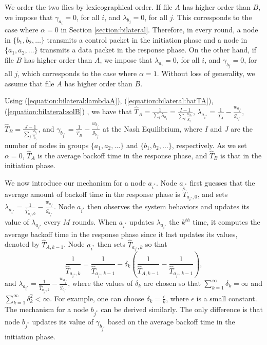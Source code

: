 \documentclass[11pt, conference]{IEEEtran}
\begin{document}
We order the two flies by lexicographical order. If file $A$ has higher order than $B$, we impose that $\gamma_{a_i}=0$, for all $i$, and $\lambda_{b_j}=0$, for all $j$. This corresponds to the case where $\alpha=0$ in Section \ref{section:bilateral}. Therefore, in every round, a node in $\{b_1,b_2,\dots\}$ transmits a control packet in the initiation phase and a node in $\{a_1,a_2,\dots\}$ transmits a data packet in the response phase. On the other hand, if file $B$ has higher order than $A$, we impose that $\lambda_{a_i}=0$, for all $i$, and $\gamma_{b_j}=0$, for all $j$, which corresponds to the case where $\alpha=1$. Without loss of generality, we assume that file $A$ has higher order than $B$.

Using (\ref{equation:bilateral:lambdaA}), (\ref{equation:bilateral:hatTA}), (\ref{equation:bilateral:solB}) , we have that $\hat{T}_A=\frac{1}{\sum_i\lambda_{a_i}}=\frac{I-1}{\sum_i\frac{w_{a_i}}{g_{a_i}}}$, $\lambda_{a_{i^*}}=\frac{1}{\hat{T}_A}-\frac{w_{a_{i^*}}}{g_{a_{i^*}}}$, $\hat{T}_B= \frac{J-1}{\sum_j\frac{w_{b_j}}{g_{b_j}}}$, and $\gamma_{b_{j^*}}=\frac{1}{\hat{T}_B}-\frac{w_{b_{j^*}}}{g_{b_{j^*}}}$ at the Nash Equilibrium, where $I$ and $J$ are the number of nodes in groups $\{a_1,a_2,\dots\}$ and $\{b_1,b_2,\dots\}$, respectively. As we set $\alpha =0$, $\hat{T}_A$ is the average backoff time in the response phase, and $\hat{T}_B$ is that in the initiation phase.

We now introduce our mechanism for a node $a_{i^*}$. Node $a_{i^*}$ first guesses that the average amount of backoff time in the response phase is $\hat{T}_{a_{i^*},0}$, and sets $\lambda_{a_{i^*}}=\frac{1}{\hat{T}_{a_{i^*},0}}-\frac{w_{a_{i^*}}}{g_{a_{i^*}}}$. Node $a_{i^*}$ then observes the system behaviors and updates its value of $\lambda_{a_{i^*}}$ every $M$ rounds. When ${a_{i^*}}$ updates $\lambda_{a_{i^*}}$ the $k^{th}$ time, it computes the average backoff time in the response phase since it last updates its values, denoted by $\hat{T}_{A,k-1}$. Node ${a_{i^*}}$ then sets $\hat{T}_{a_{i^*},k}$ so that $$\frac{1}{\hat{T}_{a_{i^*},k}}=\frac{1}{\hat{T}_{a_{i^*},k-1}}-\delta_k(\frac{1}{\hat{T}_{A,k-1}}-\frac{1}{\hat{T}_{a_{i^*},k-1}}),$$ and $\lambda_{a_{i^*}}=\frac{1}{\hat{T}_{a_{i^*},k}}-\frac{w_{a_{i^*}}}{g_{a_{i^*}}}$, where the values of $\delta_k$ are chosen so that $\sum_{k=1}^\infty\delta_k=\infty$ and $\sum_{k=1}^\infty\delta^2_k<\infty$. For example, one can choose $\delta_k=\frac{\epsilon}{k}$, where $\epsilon$ is a small constant.  The mechanism for a node $b_{j^*}$ can be derived similarly. The only difference is that node $b_{j^*}$ updates its value of $\gamma_{b_{j^*}}$ based on the average backoff time in the initiation phase.
\end{document}
